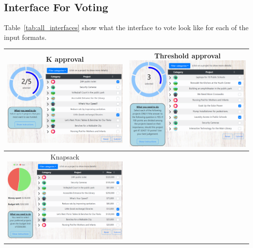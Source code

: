 \documentclass[10pt]{article}
\begin{document}
\begin{appendices}

\section{Interface For Voting}\label{app:interfaces}
Table~\ref{tab:all_interfaces} show what the interface to vote look like for each of the input formats.

\begin{table}[ht!]
  \begin{center}
    \begin{tabular}{|c|c|}
    \hline
    \makecell{K approval \\ \includegraphics[width=7.5cm]{experiment/k approval.PNG}} & \makecell{Threshold approval \\  \includegraphics[width=7.5cm]{experiment/threshold approval.PNG}}\\
    \hline
    \makecell{Knapsack \\ \includegraphics[width=7.5cm]{experiment/knapsack.PNG}} & 

\end{tabular}
\end{center}
\end{table}
\end{appendices}
\end{document}
